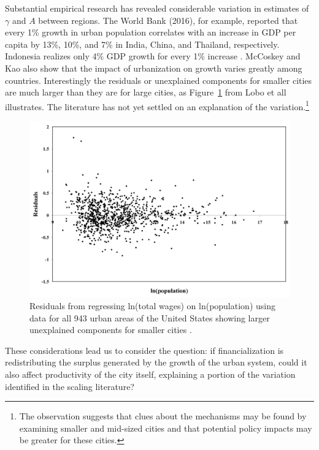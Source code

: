 Substantial empirical research has revealed considerable variation in estimates of $\gamma$ and $A$ between regions. \cite{mccoskeyPanelDataInvestigation1999, haryantoRelationshipUrbanizationEducation2021, pugaMagnitudeCausesAgglomeration2010, loboUrbanScalingProduction2013} The World Bank (2016), for example, reported that every 1\% growth in urban population correlates with an increase in GDP per capita by 13\%, 10\%, and 7\% in India, China, and Thailand, respectively. Indonesia realizes only 4\% GDP growth for every 1\% increase \cite{haryantoRelationshipUrbanizationEducation2021}. McCoskey and Kao \cite{mccoskeyPanelDataInvestigation1999} also show that the impact of urbanization on growth varies greatly among countries. 
Interestingly the residuals or unexplained components for smaller cities are much larger than they are for large cities, as Figure~\ref{fig-residuals-lobo} from Lobo et all \cite{loboUrbanScalingProduction2013} illustrates.  The literature \cite{loboUrbanScalingProduction2013, pugaMagnitudeCausesAgglomeration2010} has not yet settled on an explanation of the variation.\footnote{The observation suggests that clues about the mechanisms may be found by examining smaller and mid-sized cities and that potential policy impacts may be greater for these cities.} 
\begin{figure}[h!tb]
\centering
\includegraphics[scale=0.40]{fig/residuals-lobo.png}
\caption[Residuals from regressing ln(total wages) on ln(population)]{Residuals from regressing ln(total wages) on ln(population) using data for all 943 urban areas of the United States showing larger unexplained components for smaller cities  \cite{loboUrbanScalingProduction2013}.}\label{fig-residuals-lobo}
\end{figure} 
These considerations lead us to consider the question: if financialization is redistributing the surplus generated by the growth of the urban system, could it also affect  productivity of the city itself, explaining a portion of the variation identified in the scaling literature? 



